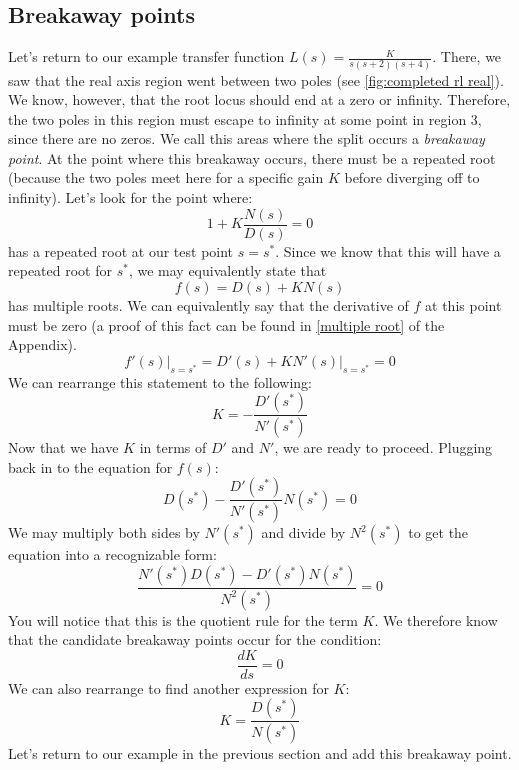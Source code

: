 \subsection{Breakaway points}
Let's return to our example transfer function $L(s)=\frac{K}{s(s+2)(s+4)}$. There, we saw that the real axis region went between two poles (see \autoref{fig:completed rl real}). We know, however, that the root locus should end at a zero or infinity. Therefore, the two poles in this region must escape to infinity at some point in region 3, since there are no zeros. We call this areas where the split occurs a \textit{breakaway point}. At the point where this breakaway occurs, there must be a repeated root (because the two poles meet here for a specific gain $K$ before diverging off to infinity). Let's look for the point where:
$$1+K\frac{N(s)}{D(s)}=0$$ has a repeated root at our test point $s=s^*$. Since we know that this will have a repeated root for $s^*$, we may equivalently state that
\begin{equation}\label{eq:breakaway}
f(s)=D(s)+KN(s)
\end{equation}
has multiple roots. We can equivalently say that the derivative of $f$ at this point must be zero (a proof of this fact can be found in \autoref{multiple root} of the Appendix).
$$f'(s)\bigg\vert_{s=s^*}=D'(s)+KN'(s)\bigg\vert_{s=s^*}=0$$
We can rearrange this statement to the following:
$$K=-\frac{D'(s^*)}{N'(s^*)}$$
Now that we have $K$  in terms of $D'$ and $N'$, we are ready to proceed. Plugging back in to the equation for $f(s)$:
$$D(s^*)-\frac{D'(s^*)}{N'(s^*)}N(s^*)=0$$
We may multiply both sides by $N'(s^*)$ and divide by  $N^2(s^*)$ to get the equation into a recognizable form:
$$\frac{N'(s^*)D(s^*)-D'(s^*)N(s^*)}{N^2(s^*)}=0$$
You will notice that this is the quotient rule for the term $K$. We therefore know that the candidate breakaway points occur for the condition:
$$\frac{dK}{ds}=0$$
We can also rearrange  to find another expression for $K$:
$$K=\frac{D(s^*)}{N(s^*)}$$
Let's return to our example in the previous section and add this breakaway point.
